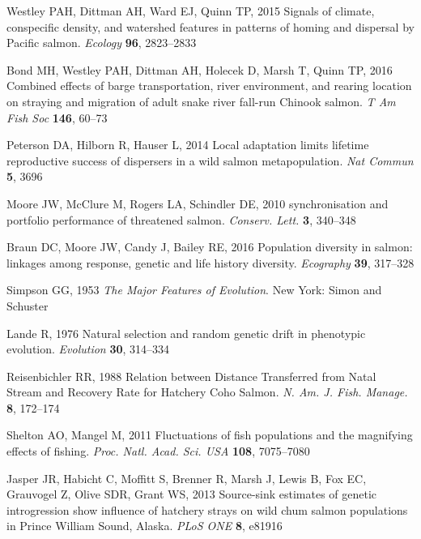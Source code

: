 \documentclass{revtex4}
\begin{document}
\begin{thebibliography}{10}
Westley PAH, Dittman AH, Ward EJ, Quinn TP, 2015 {Signals of climate,
  conspecific density, and watershed features in patterns of homing and
  dispersal by Pacific salmon.}
\newblock \emph{Ecology} \textbf{96}, 2823--2833

Bond MH, Westley PAH, Dittman AH, Holecek D, Marsh T, Quinn TP, 2016 {Combined
  effects of barge transportation, river environment, and rearing location on
  straying and migration of adult snake river fall-run Chinook salmon}.
\newblock \emph{T Am Fish Soc} \textbf{146}, 60--73

Peterson DA, Hilborn R, Hauser L, 2014 {Local adaptation limits lifetime
  reproductive success of dispersers in a wild salmon metapopulation}.
\newblock \emph{Nat Commun} \textbf{5}, 3696

Moore JW, McClure M, Rogers LA, Schindler DE, 2010 {synchronisation and
  portfolio performance of threatened salmon}.
\newblock \emph{Conserv. Lett.} \textbf{3}, 340--348

Braun DC, Moore JW, Candy J, Bailey RE, 2016 {Population diversity in salmon:
  linkages among response, genetic and life history diversity}.
\newblock \emph{Ecography} \textbf{39}, 317--328

Simpson GG, 1953 \emph{{The Major Features of Evolution}}.
\newblock New York: Simon and Schuster

Lande R, 1976 {Natural selection and random genetic drift in phenotypic
  evolution}.
\newblock \emph{Evolution} \textbf{30}, 314--334

Reisenbichler RR, 1988 {Relation between Distance Transferred from Natal Stream
  and Recovery Rate for Hatchery Coho Salmon}.
\newblock \emph{N. Am. J. Fish. Manage.} \textbf{8}, 172--174

Shelton AO, Mangel M, 2011 {Fluctuations of fish populations and the magnifying
  effects of fishing.}
\newblock \emph{Proc. Natl. Acad. Sci. USA} \textbf{108}, 7075--7080

Jasper JR, Habicht C, Moffitt S, Brenner R, Marsh J, Lewis B, Fox EC, Grauvogel
  Z, Olive SDR, Grant WS, 2013 {Source-sink estimates of genetic introgression
  show influence of hatchery strays on wild chum salmon populations in Prince
  William Sound, Alaska}.
\newblock \emph{PLoS ONE} \textbf{8}, e81916


\end{thebibliography}
\end{document}
